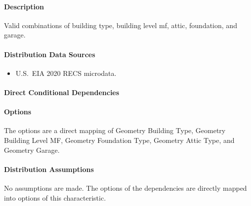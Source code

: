 \paragraph{Description}
% 
Valid combinations of building type, building level mf, attic, foundation, and garage.

\paragraph{Distribution Data Sources}
% 
\begin{itemize}
    \item U.S.~EIA 2020 RECS microdata.
\end{itemize}

\paragraph{Direct Conditional Dependencies}


\paragraph{Options}
The options are a direct mapping of Geometry Building Type, Geometry Building Level MF, Geometry Foundation Type, Geometry Attic Type, and Geometry Garage.

\paragraph{Distribution Assumptions}
% 
No assumptions are made. The options of the dependencies are directly mapped into options of this characteristic.
